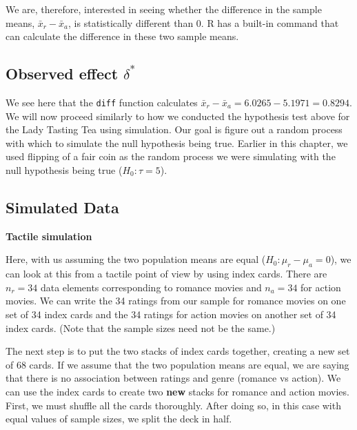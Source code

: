 \documentclass[]{tufte-book}
\newenvironment{Shaded}{\begin{snugshade}}{\end{snugshade}}
\newcommand{\KeywordTok}[1]{\textcolor[rgb]{0.13,0.29,0.53}{\textbf{{#1}}}}
\newcommand{\DataTypeTok}[1]{\textcolor[rgb]{0.13,0.29,0.53}{{#1}}}
\newcommand{\StringTok}[1]{\textcolor[rgb]{0.31,0.60,0.02}{{#1}}}
\newcommand{\NormalTok}[1]{{#1}}
\theoremstyle{definition}
\theoremstyle{definition}
\theoremstyle{remark}
\begin{document}
We are, therefore, interested in seeing whether the difference in the
sample means, \(\bar{x}_r - \bar{x}_a\), is statistically different than
0. R has a built-in command that can calculate the difference in these
two sample means.

\subsection{\texorpdfstring{Observed effect
\(\delta^*\)}{Observed effect \textbackslash{}delta\^{}*}}\label{observed-effect-delta-1}

\begin{Shaded}
\end{Shaded}

We see here that the \texttt{diff} function calculates
\(\bar{x}_r - \bar{x}_a = 6.0265 - 5.1971 = 0.8294\). We will now
proceed similarly to how we conducted the hypothesis test above for the
Lady Tasting Tea using simulation. Our goal is figure out a random
process with which to simulate the null hypothesis being true. Earlier
in this chapter, we used flipping of a fair coin as the random process
we were simulating with the null hypothesis being true
(\(H_0: \tau = 5\)).

\subsection{Simulated Data}\label{simulated-data-1}

\textbf{Tactile simulation}

Here, with us assuming the two population means are equal
(\(H_0: \mu_r - \mu_a = 0\)), we can look at this from a tactile point
of view by using index cards. There are \(n_r = 34\) data elements
corresponding to romance movies and \(n_a = 34\) for action movies. We
can write the 34 ratings from our sample for romance movies on one set
of 34 index cards and the 34 ratings for action movies on another set of
34 index cards. (Note that the sample sizes need not be the same.)

The next step is to put the two stacks of index cards together, creating
a new set of 68 cards. If we assume that the two population means are
equal, we are saying that there is no association between ratings and
genre (romance vs action). We can use the index cards to create two
\textbf{new} stacks for romance and action movies. First, we must
shuffle all the cards thoroughly. After doing so, in this case with
equal values of sample sizes, we split the deck in half.
\end{document}
